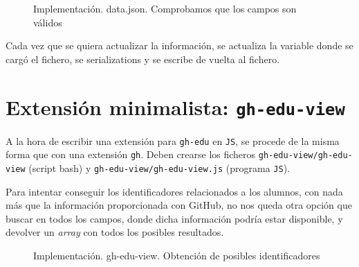 \begin{figure}[H]
    \centering
    \caption{Implementación. data.json. Comprobamos que los campos son válidos}
    \label{fig:comprobar}
\end{figure}

Cada vez que se quiera actualizar la información, se actualiza la variable donde se cargó el fichero, se \glspl{serialization} y se escribe de vuelta al fichero.

\section{Extensión minimalista: {\tt gh-edu-view}}\label{sec:gh-edu-view-implementation}

A la hora de escribir una extensión para \verb|gh-edu| en \verb|JS|, se procede de la misma forma que con una extensión \verb|gh|.
Deben crearse los ficheros \verb|gh-edu-view/gh-edu-view| (script bash) y \verb|gh-edu-view/gh-edu-view.js| (programa \verb|JS|).

Para intentar conseguir los identificadores relacionados a los alumnos, con nada más que la información proporcionada con GitHub, no nos queda otra opción que buscar en todos los campos, donde dicha información podría estar disponible, y devolver un \emph{array} con todos los posibles resultados.

\begin{figure}[H]
    \centering
    \caption{Implementación. gh-edu-view. Obtención de posibles identificadores}
    \label{fig:viewId}
\end{figure}

